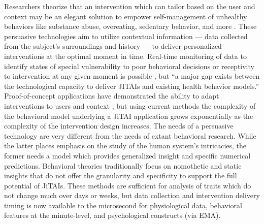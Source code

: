 \documentclass[runningheads,a4paper]{llncs}
\begin{document}
Researchers theorize that an intervention which can tailor based on the user and context may be an elegant solution to empower self-management of unhealthy behaviors like substance abuse, overeating, sedentary behavior, and more \cite{nahum2014}.
These persuasive technologies aim to utilize contextual information --- data collected from the subject's surroundings and history --- to deliver personalized interventions at the optimal moment in time.
Real-time monitoring of data to identify states of special vulnerability to poor behavioral decisions or receptivity to intervention at any given moment is possible \cite{hekler2013realizing}, but ``a major gap exists between the technological capacity to deliver JITAIs and existing health behavior models.'' \cite{nahum2014}
Proof-of-concept applications have demonstrated the ability to adapt interventions to users \cite{dallery2014optimizing} \cite{beck2010challenges} and context \cite{brailsford2010towards} \cite{collins2004conceptual}, but using current methods the complexity of the behavioral model underlying a JiTAI application grows exponentially as the complexity of the intervention design increases. 
The needs of a persuasive technology are very different from the needs of extant behavioral research.
While the latter places emphasis on the study of the human system's intricacies, the former needs a model which provides generalized insight and specific numerical predictions.
Behavioral theories traditionally focus on nomothetic and static insights that do not offer the granularity and specificity to support the full potential of JiTAIs\cite{riley2011healthbehavior}.
These methods are sufficient for analysis of traits which do not change much over days or weeks, but data collection and intervention delivery timing is now available to the microsecond for physiological data, behavioral features at the minute-level, and psychological constructs (via EMA\cite{shiffman2008ecological}).
\end{document}
